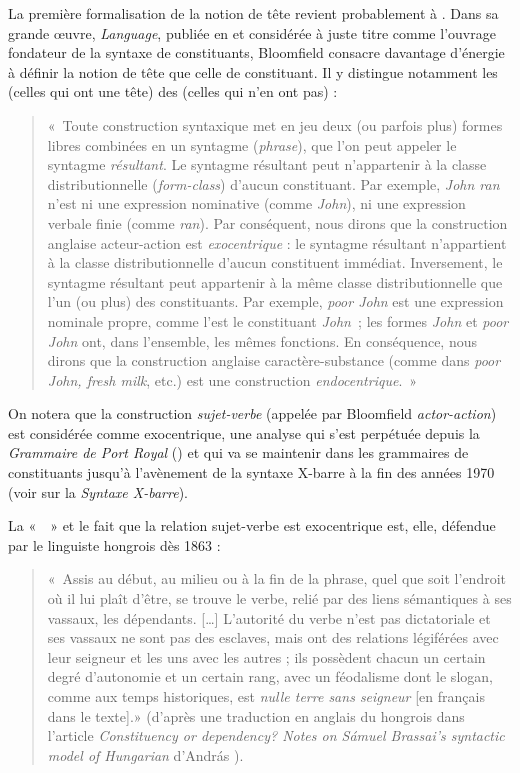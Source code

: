 {    La première formalisation de la notion de tête revient probablement à . Dans sa grande œuvre, \textit{Language}, publiée en \citeyear{bloomfield1933language} et considérée à juste titre comme l’ouvrage fondateur de la syntaxe de constituants, Bloomfield consacre davantage d’énergie à définir la notion de tête que celle de constituant. Il y distingue notamment les  (celles qui ont une tête) des  (celles qui n’en ont pas) : 
    \begin{quote}«~Toute construction syntaxique met en jeu deux (ou parfois plus) formes libres combinées en un syntagme (\textit{phrase}), que l’on peut appeler le syntagme \textit{résultant}. Le syntagme résultant peut n’appartenir à la classe distributionnelle (\textit{form-class}) d’aucun constituant. Par exemple, \textit{John ran} n’est ni une expression nominative (comme \textit{John}), ni une expression verbale finie (comme \textit{ran}). Par conséquent, nous dirons que la construction anglaise acteur-action est \textit{exocentrique} : le syntagme résultant n’appartient à la classe distributionnelle d’aucun constituent immédiat. Inversement, le syntagme résultant peut appartenir à la même classe distributionnelle que l’un (ou plus) des constituants. Par exemple, \textit{poor John} est une expression nominale propre, comme l’est le constituant \textit{John~}; les formes \textit{John} et \textit{poor John} ont, dans l’ensemble, les mêmes fonctions. En conséquence, nous dirons que la construction anglaise caractère-substance (comme dans \textit{poor John, fresh milk}, etc.) est une construction \textit{endocentrique}.~» \end{quote} 
    On notera que la construction \textit{sujet-verbe} (appelée par Bloomfield \textit{actor-action}) est considérée comme exocentrique, une analyse qui s’est perpétuée depuis la \textit{Grammaire de Port Royal} (\citealt{ArnauldLancelot1660}) et qui va se maintenir dans les grammaires de constituants jusqu’à l’avènement de la syntaxe X-barre à la fin des années 1970 (voir  sur la \textit{Syntaxe X-barre}).

    La «~~» et le fait que la relation sujet-verbe est exocentrique est, elle, défendue par le linguiste hongrois  dès 1863 : 
    \begin{quote}«~Assis au début, au milieu ou à la fin de la phrase, quel que soit l’endroit où il lui plaît d’être, se trouve le verbe, relié par des liens sémantiques à ses vassaux, les dépendants. […] L’autorité du verbe n’est pas dictatoriale et ses vassaux ne sont pas des esclaves, mais ont des relations légiférées avec leur seigneur et les uns avec les autres ; ils possèdent chacun un certain degré d’autonomie et un certain rang, avec un féodalisme dont le slogan, comme aux temps historiques, est \textit{nulle terre sans seigneur} [en français dans le texte].» (d’après une traduction en anglais du hongrois dans l’article \textit{Constituency or dependency? Notes on Sámuel Brassai’s syntactic model of Hungarian} d’András \citealt{imrenyi2013constituency}). \end{quote}

}
